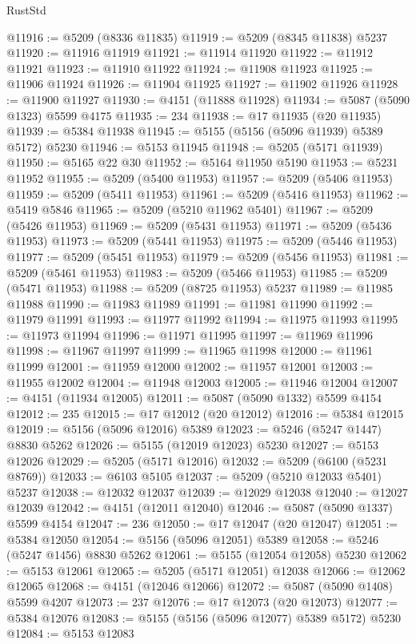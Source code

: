 \begin{lexlean}{RustStd}
\begin{coremodule}
@11916 := @5209 (@8336 @11835)
@11919 := @5209 (@8345 @11838) @5237
@11920 := @11916 @11919
@11921 := @11914 @11920
@11922 := @11912 @11921
@11923 := @11910 @11922
@11924 := @11908 @11923
@11925 := @11906 @11924
@11926 := @11904 @11925
@11927 := @11902 @11926
@11928 := @11900 @11927
@11930 := @4151 (@11888 @11928)
@11934 := @5087 (@5090 @1323) @5599 @4175
@11935 := 234
@11938 := @17 @11935 (@20 @11935)
@11939 := @5384 @11938
@11945 := @5155 (@5156 (@5096 @11939) @5389 @5172) @5230
@11946 := @5153 @11945
@11948 := @5205 (@5171 @11939)
@11950 := @5165 @22 @30
@11952 := @5164 @11950 @5190
@11953 := @5231 @11952
@11955 := @5209 (@5400 @11953)
@11957 := @5209 (@5406 @11953)
@11959 := @5209 (@5411 @11953)
@11961 := @5209 (@5416 @11953)
@11962 := @5419 @5846
@11965 := @5209 (@5210 @11962 @5401)
@11967 := @5209 (@5426 @11953)
@11969 := @5209 (@5431 @11953)
@11971 := @5209 (@5436 @11953)
@11973 := @5209 (@5441 @11953)
@11975 := @5209 (@5446 @11953)
@11977 := @5209 (@5451 @11953)
@11979 := @5209 (@5456 @11953)
@11981 := @5209 (@5461 @11953)
@11983 := @5209 (@5466 @11953)
@11985 := @5209 (@5471 @11953)
@11988 := @5209 (@8725 @11953) @5237
@11989 := @11985 @11988
@11990 := @11983 @11989
@11991 := @11981 @11990
@11992 := @11979 @11991
@11993 := @11977 @11992
@11994 := @11975 @11993
@11995 := @11973 @11994
@11996 := @11971 @11995
@11997 := @11969 @11996
@11998 := @11967 @11997
@11999 := @11965 @11998
@12000 := @11961 @11999
@12001 := @11959 @12000
@12002 := @11957 @12001
@12003 := @11955 @12002
@12004 := @11948 @12003
@12005 := @11946 @12004
@12007 := @4151 (@11934 @12005)
@12011 := @5087 (@5090 @1332) @5599 @4154
@12012 := 235
@12015 := @17 @12012 (@20 @12012)
@12016 := @5384 @12015
@12019 := @5156 (@5096 @12016) @5389
@12023 := @5246 (@5247 @1447) @8830 @5262
@12026 := @5155 (@12019 @12023) @5230
@12027 := @5153 @12026
@12029 := @5205 (@5171 @12016)
@12032 := @5209 (@6100 (@5231 @8769))
@12033 := @6103 @5105
@12037 := @5209 (@5210 @12033 @5401) @5237
@12038 := @12032 @12037
@12039 := @12029 @12038
@12040 := @12027 @12039
@12042 := @4151 (@12011 @12040)
@12046 := @5087 (@5090 @1337) @5599 @4154
@12047 := 236
@12050 := @17 @12047 (@20 @12047)
@12051 := @5384 @12050
@12054 := @5156 (@5096 @12051) @5389
@12058 := @5246 (@5247 @1456) @8830 @5262
@12061 := @5155 (@12054 @12058) @5230
@12062 := @5153 @12061
@12065 := @5205 (@5171 @12051) @12038
@12066 := @12062 @12065
@12068 := @4151 (@12046 @12066)
@12072 := @5087 (@5090 @1408) @5599 @4207
@12073 := 237
@12076 := @17 @12073 (@20 @12073)
@12077 := @5384 @12076
@12083 := @5155 (@5156 (@5096 @12077) @5389 @5172) @5230
@12084 := @5153 @12083

\end{coremodule}
\end{lexlean}
